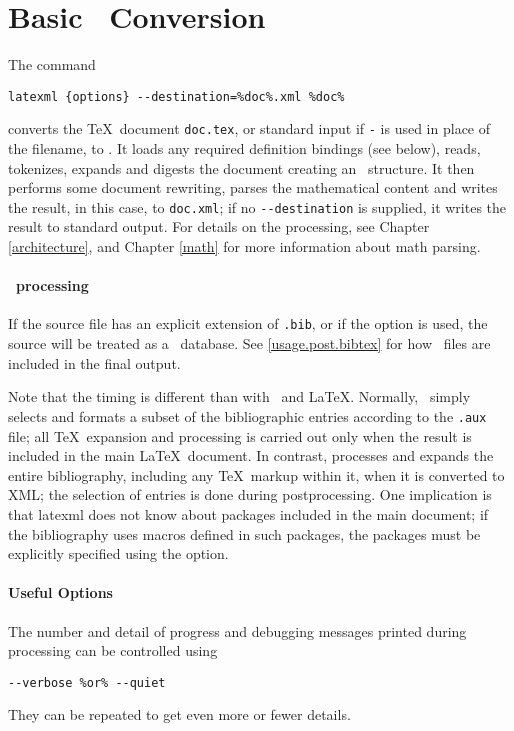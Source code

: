 \documentclass{book}
\newcommand{\shellcode}{\lstinline[style=shell]}
\begin{document}
\section[Conversion]{Basic \XML\ Conversion}\label{usage.conversion}
The command
\begin{lstlisting}[style=shell]
latexml {options} --destination=%doc%.xml %doc%
\end{lstlisting}
converts the \TeX\ document \texttt{doc.tex},
or standard input if \texttt{-} is used in place of the filename, to \XML.
It loads any required definition bindings (see below),
reads, tokenizes, expands and digests the document creating an \XML\ structure.
It then performs some document rewriting, parses the mathematical content
and writes the result, in this case, to \texttt{doc.xml};
if no \shellcode|--destination| is supplied, it writes the result to standard output.
For details on the processing, see Chapter \ref{architecture},
and Chapter \ref{math} for more information about math parsing.

\paragraph{\BibTeX\ processing}\label{usage.conversion.bibtex}
If the source file has an explicit extension of \texttt{.bib},
or if the  option is used, the source will be
treated as a \BibTeX\ database.  See \ref{usage.post.bibtex}
for how \BibTeX\ files are included in the final output.

\begin{advanced}
Note that the timing is different than with \BibTeX\ and \LaTeX.
Normally, \BibTeX\ simply selects and formats a subset of the
bibliographic entries according to the \texttt{.aux} file;
all \TeX\ expansion and processing is carried out only when
the result is included in the main \LaTeX\ document.
In contrast,  processes and expands
the entire bibliography, including any \TeX\ markup within it,
when it is converted to XML;
the selection of entries is done during postprocessing.
One implication is that latexml does not know about packages
included in the main document; if the bibliography uses
macros defined in such packages, the packages must be explicitly
specified using the  option.
\end{advanced}

\paragraph{Useful Options}\label{usage.conversion.options}
The number and detail of progress and debugging messages printed
during processing can be controlled using
\begin{lstlisting}[style=shell]
--verbose %or% --quiet
\end{lstlisting}
They can  be repeated to get even more or fewer details.
\end{document}
